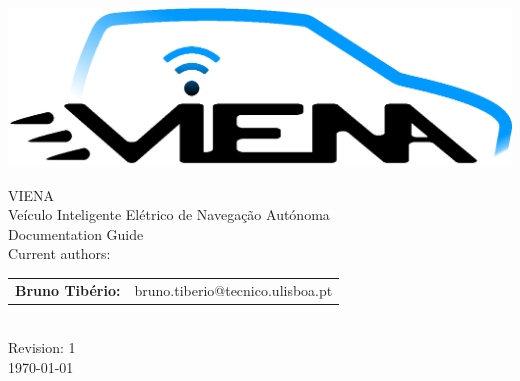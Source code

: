 \begin{center}
%
\vspace{3cm}
\includegraphics[width=0.7\linewidth]{figures/VIENA-logo.eps}

\vspace{1.0cm}
{\FontLb VIENA} \\ {\FontMn Veículo Inteligente Elétrico de Navegação Autónoma}\\ %
\vspace{0.2cm}
{\FontMn Documentation Guide} \\
\vfill
{\FontMb Current authors:}\\
\begin{tabular}{cl}
	\textbf{Bruno Tibério:} & bruno.tiberio@tecnico.ulisboa.pt \hfill         \\
\end{tabular} 
\\
\vfill
{\FontMb Revision: 1}\\
\vspace{0.5cm}
{\FontMb \today} \\
%
\end{center}
